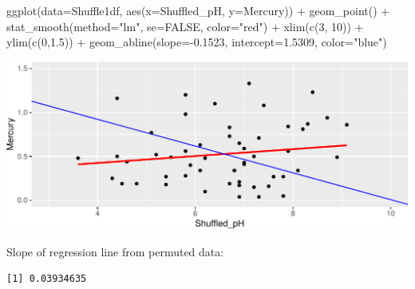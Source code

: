 \documentclass[
  letterpaper,
  DIV=11,
  numbers=noendperiod]{scrreprt}
\newenvironment{Shaded}{\begin{snugshade}}{\end{snugshade}}
\newcommand{\AttributeTok}[1]{\textcolor[rgb]{0.40,0.45,0.13}{#1}}
\newcommand{\ConstantTok}[1]{\textcolor[rgb]{0.56,0.35,0.01}{#1}}
\newcommand{\DecValTok}[1]{\textcolor[rgb]{0.68,0.00,0.00}{#1}}
\newcommand{\FloatTok}[1]{\textcolor[rgb]{0.68,0.00,0.00}{#1}}
\newcommand{\FunctionTok}[1]{\textcolor[rgb]{0.28,0.35,0.67}{#1}}
\newcommand{\NormalTok}[1]{\textcolor[rgb]{0.00,0.23,0.31}{#1}}
\newcommand{\OtherTok}[1]{\textcolor[rgb]{0.00,0.23,0.31}{#1}}
\newcommand{\SpecialCharTok}[1]{\textcolor[rgb]{0.37,0.37,0.37}{#1}}
\newcommand{\StringTok}[1]{\textcolor[rgb]{0.13,0.47,0.30}{#1}}
\begin{document}
\begin{Shaded}
\begin{Highlighting}[]
\FunctionTok{ggplot}\NormalTok{(}\AttributeTok{data=}\NormalTok{Shuffle1df, }\FunctionTok{aes}\NormalTok{(}\AttributeTok{x=}\NormalTok{Shuffled\_pH, }\AttributeTok{y=}\NormalTok{Mercury)) }\SpecialCharTok{+} 
  \FunctionTok{geom\_point}\NormalTok{() }\SpecialCharTok{+} \FunctionTok{stat\_smooth}\NormalTok{(}\AttributeTok{method=}\StringTok{"lm"}\NormalTok{, }\AttributeTok{se=}\ConstantTok{FALSE}\NormalTok{, }\AttributeTok{color=}\StringTok{"red"}\NormalTok{) }\SpecialCharTok{+} 
  \FunctionTok{xlim}\NormalTok{(}\FunctionTok{c}\NormalTok{(}\DecValTok{3}\NormalTok{, }\DecValTok{10}\NormalTok{)) }\SpecialCharTok{+} \FunctionTok{ylim}\NormalTok{(}\FunctionTok{c}\NormalTok{(}\DecValTok{0}\NormalTok{,}\FloatTok{1.5}\NormalTok{)) }\SpecialCharTok{+} 
  \FunctionTok{geom\_abline}\NormalTok{(}\AttributeTok{slope=}\SpecialCharTok{{-}}\FloatTok{0.1523}\NormalTok{, }\AttributeTok{intercept=}\FloatTok{1.5309}\NormalTok{, }\AttributeTok{color=}\StringTok{"blue"}\NormalTok{)}
\end{Highlighting}
\end{Shaded}

\includegraphics{Ch3_files/figure-pdf/unnamed-chunk-216-1.pdf}

Slope of regression line from permuted data:

\begin{Shaded}
\end{Shaded}

\begin{verbatim}
[1] 0.03934635
\end{verbatim}
\end{document}
